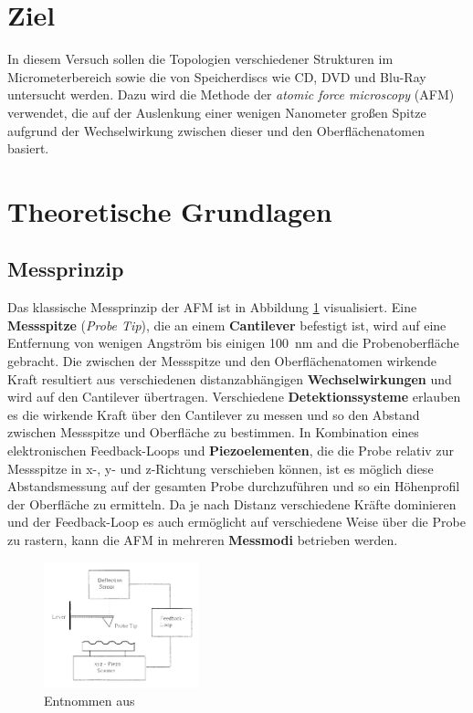 \section{Ziel}
    In diesem Versuch sollen die Topologien verschiedener Strukturen im Micrometerbereich sowie die von Speicherdiscs wie CD, DVD und Blu-Ray untersucht werden. Dazu wird die Methode der \textit{atomic force
    microscopy} (AFM) verwendet, die auf der Auslenkung einer wenigen Nanometer großen Spitze aufgrund der Wechselwirkung zwischen dieser und den Oberflächenatomen basiert.    
    
\section{Theoretische Grundlagen}
    \subsection{Messprinzip}
        Das klassische Messprinzip der AFM ist in Abbildung \ref{fig:prinzip} visualisiert. Eine \textbf{Messspitze} (\textit{Probe Tip}), die an einem \textbf{Cantilever} befestigt ist, wird auf eine 
        Entfernung von wenigen Angström bis einigen \SI{100}{\nano\metre} and die Probenoberfläche gebracht. Die zwischen der Messspitze und den Oberflächenatomen wirkende Kraft resultiert aus verschiedenen
        distanzabhängigen \textbf{Wechselwirkungen} und wird auf den Cantilever übertragen. Verschiedene \textbf{Detektionssysteme} erlauben es die wirkende Kraft über den Cantilever zu messen und so den 
        Abstand zwischen Messspitze und Oberfläche zu bestimmen. In Kombination eines elektronischen Feedback-Loops und \textbf{Piezoelementen}, die die Probe relativ zur Messspitze in x-, y- und z-Richtung
        verschieben können, ist es möglich diese Abstandsmessung auf der gesamten Probe durchzuführen und so ein Höhenprofil der Oberfläche zu ermitteln. Da je nach Distanz verschiedene Kräfte dominieren und
        der Feedback-Loop es auch ermöglicht auf verschiedene Weise über die Probe zu rastern, kann die AFM in mehreren \textbf{Messmodi} betrieben werden.

        \FloatBarrier

        \begin{figure}[h]
          \centering
          \includegraphics[width = 0.4\textwidth]{pictures/prinzip.png}
          \caption{Entnommen aus \cite{meyer_atomic_1992}}
          \label{fig:prinzip}
        \end{figure}
    

